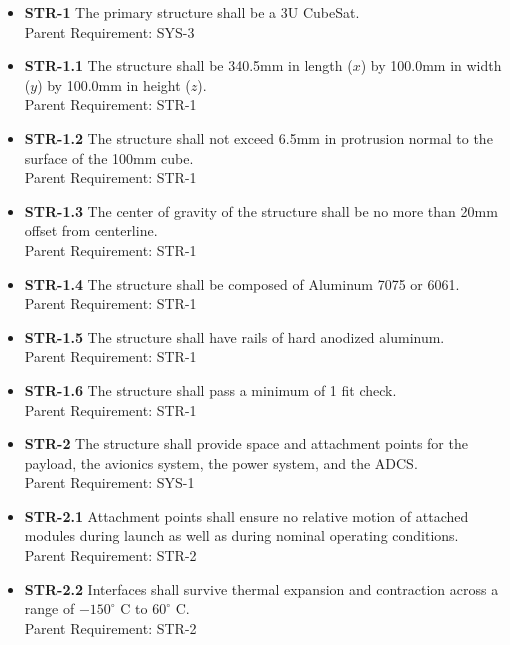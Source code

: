 \documentclass[12pt]{article}
\begin{document}
\begin{itemize}
\item \textbf{STR-1} The primary structure shall be a 3U CubeSat. \\
Parent Requirement: SYS-3

\item \textbf{STR-1.1} The structure shall be 340.5mm in length ($x$) by 100.0mm in width ($y$) by 100.0mm in height ($z$).\\
Parent Requirement: STR-1

\item \textbf{STR-1.2} The structure shall not exceed 6.5mm in protrusion normal to the surface of the 100mm cube.\\
Parent Requirement: STR-1

\item \textbf{STR-1.3} The center of gravity of the structure shall be no more than 20mm offset from centerline.\\
Parent Requirement: STR-1

\item \textbf{STR-1.4} The structure shall be composed of Aluminum 7075 or 6061.\\
Parent Requirement: STR-1

\item \textbf{STR-1.5} The structure shall have rails of hard anodized aluminum.\\
Parent Requirement: STR-1

\item \textbf{STR-1.6} The structure shall pass a minimum of 1 fit check.\\
Parent Requirement: STR-1

\item \textbf{STR-2} The structure shall provide space and attachment points for the payload, the avionics system, the power system, and the ADCS.\\
Parent Requirement: SYS-1

\item \textbf{STR-2.1} Attachment points shall ensure no relative motion of attached modules during launch as well as during nominal operating conditions.\\
Parent Requirement: STR-2

\item \textbf{STR-2.2} Interfaces shall survive thermal expansion and contraction across a range of $-150^\circ$ C to $60^\circ$ C.\\
Parent Requirement: STR-2


\end{itemize}
\end{document}
